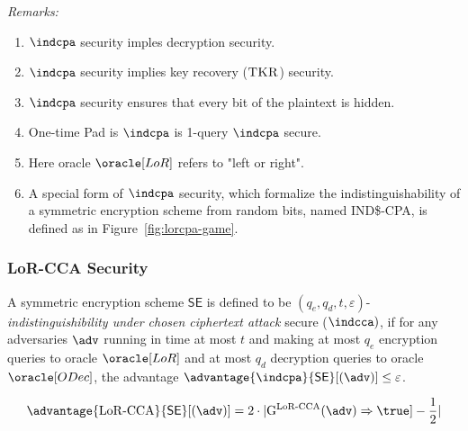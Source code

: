\bigskip 
\textit{Remarks:}
\begin{enumerate}
	\item $\indcpa$ security imples decryption security.
	\item $\indcpa$ security implies key recovery ($\textsc{TKR}$) security.
	\item $\indcpa$ security ensures that every bit of the plaintext is hidden. 
	\item One-time Pad is $\indcpa$ is 1-query $\indcpa$ secure. 
	\item Here oracle $\oracle[LoR]$ refers to "left or right". 
	\item A special form of $\indcpa$ security, which formalize the indistinguishability of a symmetric encryption scheme from random bits, named IND\$-CPA, is defined as in Figure~\ref{fig:lorcpa-game}. 
\end{enumerate}



\subsubsection{LoR-CCA Security}
A symmetric encryption scheme  $\textsf{SE}$ is defined to be $(q_e, q_d, t,\varepsilon)$-\textit{indistinguishibility under chosen ciphertext attack} secure ($\indcca)$, if for any adversaries $\adv$ running in time at most $t$ and making at most $q_e$ encryption queries to oracle $\oracle[LoR]$ and at most $q_d$ decryption queries to oracle $\oracle[ODec]$, the advantage $\advantage{\indcpa}{\textsf{SE}}[(\adv)] \leq \varepsilon$.

$$
\advantage{\lorcca}{\textsf{SE}}[(\adv)] = 2 \cdot | \mathrm{G}^{\lorcca}(\adv) \Rightarrow \true ] - \frac{1}{2} | 
$$ 


